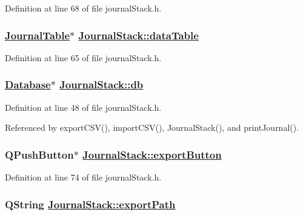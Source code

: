 Definition at line 68 of file journal\-Stack.h.\hypertarget{classJournalStack_r12}{
\subsubsection[dataTable]{\setlength{\rightskip}{0pt plus 5cm}\hyperlink{classJournalTable}{Journal\-Table}$\ast$ \hyperlink{classJournalStack_r12}{Journal\-Stack::data\-Table}}}
\label{classJournalStack_r12}


Definition at line 65 of file journal\-Stack.h.\hypertarget{classJournalStack_r0}{
\subsubsection[db]{\setlength{\rightskip}{0pt plus 5cm}\hyperlink{classDatabase}{Database}$\ast$ \hyperlink{classJournalStack_r0}{Journal\-Stack::db}}}
\label{classJournalStack_r0}


Definition at line 48 of file journal\-Stack.h.

Referenced by export\-CSV(), import\-CSV(), Journal\-Stack(), and print\-Journal().\hypertarget{classJournalStack_r21}{
\subsubsection[exportButton]{\setlength{\rightskip}{0pt plus 5cm}QPush\-Button$\ast$ \hyperlink{classJournalStack_r21}{Journal\-Stack::export\-Button}}}
\label{classJournalStack_r21}


Definition at line 74 of file journal\-Stack.h.\hypertarget{classJournalStack_r3}{
\subsubsection[exportPath]{\setlength{\rightskip}{0pt plus 5cm}QString \hyperlink{classJournalStack_r3}{Journal\-Stack::export\-Path}}}
\label{classJournalStack_r3}


